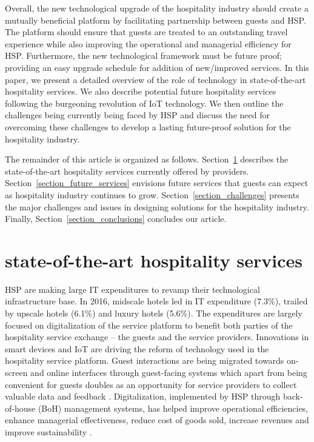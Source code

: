 \documentclass[10pt,journal,letterpaper]{IEEEtran}
\begin{document}
{Overall, the new technological upgrade of the hospitality industry should create a mutually beneficial platform by facilitating partnership between guests and HSP. The platform should ensure that guests are treated to an outstanding travel experience while also improving the operational and managerial efficiency for HSP. Furthermore, the new technological framework must be future proof; providing an easy upgrade schedule for addition of new/improved services. In this paper, we present a detailed overview of the role of technology in state-of-the-art hospitality services. We also describe potential future hospitality services following the burgeoning revolution of IoT technology. We then outline the challenges being currently being faced by HSP and discuss the need for overcoming these challenges to develop a lasting future-proof solution for the hospitality industry.

The remainder of this article is organized as follows. Section~\ref{section_state_of_the_art} describes the state-of-the-art hospitality services currently offered by providers. Section~\ref{section_future_services} envisions future services that guests can expect as hospitality industry continues to grow. Section~\ref{section_challenges} presents the major challenges and issues in designing solutions for the hospitality industry. Finally, Section~\ref{section_conclusions} concludes our article.
%
%
\section{state-of-the-art hospitality services}
\label{section_state_of_the_art}

HSP are making large IT expenditures to revamp their technological infrastructure base. In 2016, midscale hotels led in IT expenditure (7.3\%), trailed by upscale hotels (6.1\%) and luxury hotels (5.6\%)\cite{Intelity_ForecastHotelTech_2016}. The expenditures are largely focused on digitalization of the service platform to benefit both parties of the hospitality service exchange -- the guests and the service providers. Innovations in smart devices and IoT are driving the reform of technology used in the hospitality service platform. Guest interactions are being migrated towards on-screen and online interfaces through guest-facing systems which apart from being convenient for guests doubles as an opportunity for service providers to collect valuable data and feedback \cite{Deloitte_HospitalityOutlook_2014}. Digitalization, implemented by HSP through back-of-house (BoH) management systems, has helped improve operational efficiencies, enhance managerial effectiveness, reduce cost of goods sold, increase revenues and improve sustainability \cite{Kasavana_HospitalityIndustry_2014}.

}
\end{document}
